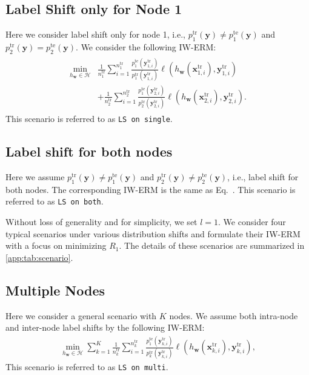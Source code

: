 \subsection{Label Shift only for Node 1} 
\label{LSonsingle}
Here we consider label shift only for node 1, i.e., $p_1^{\text{tr}}(\boldsymbol{y})\neq p_1^{\text{te}}(\boldsymbol{y})$ and $p_2^{\text{tr}}(\boldsymbol{y})= p_2^{\text{te}}(\boldsymbol{y})$.
We consider the following IW-ERM:
\begin{align}\label{IWERM:covar1}
\begin{split}
\min_{h_{\boldsymbol{w}} \in \mathcal{H}}&  \frac{1}{n_1^{\text{tr}}}\sum_{i=1}^{n_1^{\text{tr}}} \frac{p_1^{\text{te}}(\boldsymbol{y}_{1,i}^{\text{tr}})}{p_1^{\text{tr}}(\boldsymbol{y}_{1,i}^{\text{tr}})}\ell(h_{\boldsymbol{w}}(\boldsymbol{x}_{1,i}^{\text{tr}}),\boldsymbol{y}_{1,i}^{\text{tr}}) \\
&+\frac{1}{n_2^{\text{tr}}}\sum_{i=1}^{n_2^{\text{tr}}} \frac{p_1^{\text{te}}(\boldsymbol{y}_{2,i}^{\text{tr}})}{p_2^{\text{tr}}(\boldsymbol{y}_{2,i}^{\text{tr}})}\ell(h_{\boldsymbol{w}}(\boldsymbol{x}_{2,i}^{\text{tr}}),\boldsymbol{y}_{2,i}^{\text{tr}}).
\end{split}
\end{align}
This scenario is referred to as {\tt LS on single}.

\subsection{Label shift for both nodes} 
\label{LSonboth}
Here we assume $p_1^{\text{tr}}(\boldsymbol{y})\neq p_1^{\text{te}}(\boldsymbol{y})$ and $p_2^{\text{tr}}(\boldsymbol{y})\neq p_2^{\text{te}}(\boldsymbol{y})$, i.e., label shift for both nodes.
The corresponding IW-ERM is the same as Eq.~. This scenario is referred to as {\tt LS on both}.

Without loss of generality and for simplicity, we set $l = 1$. We consider four typical scenarios under various distribution shifts and formulate their IW-ERM with a focus on minimizing $R_1$. The details of these scenarios are summarized in \cref{app:tab:scenario}.

\subsection{Multiple Nodes} 
\label{LSonmulti}
Here we consider a general scenario with $K$ nodes. We assume both intra-node and inter-node label shifts by the following IW-ERM:
\begin{align}\label{IWERM:gen}
\min_{h_{\boldsymbol{w}} \in \mathcal{H}} \sum_{k=1}^K \frac{1}{n_k^{\text{tr}}}\sum_{i=1}^{n_k^{\text{tr}}} \frac{p_1^{\text{te}}(\boldsymbol{y}_{k,i}^{\text{tr}})}{p_k^{\text{tr}}(\boldsymbol{y}_{k,i}^{\text{tr}})}\ell(h_{\boldsymbol{w}}(\boldsymbol{x}_{k,i}^{\text{tr}}),\boldsymbol{y}_{k,i}^{\text{tr}}),
\end{align} 
This scenario is referred to as {\tt LS on multi}. 

